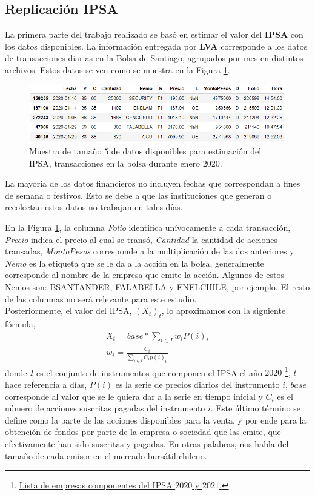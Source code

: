 \documentclass{article}
\begin{document}
\subsection{Replicación IPSA}
   	La primera parte del trabajo realizado se basó en estimar el valor del \textbf{IPSA} con los datos disponibles. La información entregada por \textbf{LVA} corresponde a los datos de transacciones diarias en la Bolsa de Santiago, agrupados por mes en distintos archivos. Estos datos se ven como se muestra en la Figura \ref{fig:trans}.
   	\begin{figure}[H]
   		\centering
   		\includegraphics[scale=.5]{imgs/transacciones_RV_data.png}
   		\caption{Muestra de tamaño $5$ de datos disponibles para estimación del IPSA, transacciones en la bolsa durante enero $2020$.}
   		\label{fig:trans}
   	\end{figure}
   \begin{remark}
   	La mayoría de los datos financieros no incluyen fechas que correspondan a fines de semana o festivos. Esto se debe a que las instituciones que generan o recolectan estos datos no trabajan en tales días.
   \end{remark}
   	En la Figura \ref{fig:trans}, la columna \textit{Folio} identifica unívocamente a cada transacción, \textit{Precio} indica el precio al cual se transó,  \textit{Cantidad} la cantidad de acciones transadas, \textit{MontoPesos} corresponde a la multiplicación de las dos anteriores y \textit{Nemo} es la etiqueta que se le da a la acción en la bolsa, generalmente corresponde al nombre de la empresa que emite la acción. Algunos de estos Nemos son: BSANTANDER, FALABELLA y ENELCHILE, por ejemplo. El resto de las columnas no será relevante para este estudio.\\
   	Posteriormente, el valor del IPSA, $(X_t)_t$, lo aproximamos con la siguiente fórmula,
   	\begin{align}
   		\label{eq:ipsa1}
		X_t = base*\sum_{i\in I} w_i P(i)_t\\
		\label{eq:ipsa2}
		w_i = \frac{C_i}{\sum_{i\in I} C_ip(i)_0}
   	\end{align}
   donde $I$ es el conjunto de instrumentos que componen el IPSA el año $2020$ \footnote{\href{https://www.rankia.cl/blog/analisis-ipsa/3229498-que-empresas-forman-parte-ipsa-2021}{Lista de empresas componentes del IPSA $2020$ y $2021$.}}, $t$ hace referencia a días, $P(i)$ es la serie de precios diarios del instrumento $i$, $base$ corresponde al valor que se le quiera dar a la serie en tiempo inicial y $C_i$ es el número de acciones suscritas pagadas del instrumento $i$. Este último término se define como la parte de las acciones disponibles para la venta, y por ende para la obtención de fondos por parte de la empresa o sociedad que las emite, que efectivamente han sido suscritas y pagadas. En otras palabras, nos habla del tamaño de cada emisor en el mercado bursátil chileno.\\
\end{document}

